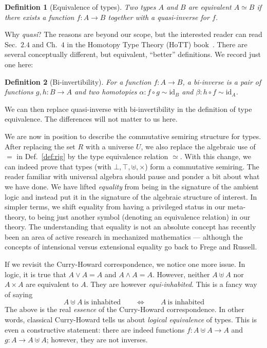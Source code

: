 \documentclass{article}
\newtheorem{defn}{Definition}[section]
\begin{document}
\begin{defn}[Equivalence of types]
  Two types $A$ and $B$ are equivalent $A \simeq B$ if there exists a
  function $f : A \rightarrow B$ together with a quasi-inverse for $f$.
\end{defn}

\noindent Why \emph{quasi}? The reasons are beyond our scope, but the
interested reader can read Sec.~$2.4$ and Ch.~$4$ in the
Homotopy Type Theory (HoTT) book~\cite{hottbook}.
There are several conceptually different, but
equivalent, ``better'' definitions.  We record just one here:

\begin{defn}[Bi-invertibility]
\label{def:biinv}
For a function $f : A \rightarrow B$, a \emph{bi-inverse} is a
pair of functions $g,h : B \rightarrow A$ and two homotopies
$\alpha : f \circ g \sim \mathrm{id}_B$ and
$\beta : h \circ f \sim \mathrm{id}_A$.
\end{defn}

\noindent We can then replace quasi-inverse with bi-invertibility in
the definition of type equivalence. The differences will not matter to
us here.

We are now in position to describe the commutative
semiring structure for types. After replacing the set $R$ with a
universe $U$, we also replace the algebraic use of $=$ in
Def.~\ref{def:rig} by the type equivalence relation $\simeq$. With
this change, we can indeed prove that types (with $\bot, \top, \uplus,
\times$) form a commutative semiring. The reader familiar with
universal algebra should pause and ponder a bit about what we have
done. We have lifted \emph{equality} from being in the signature of
the ambient logic and instead put it in the signature of the algebraic
structure of interest.  In simpler terms, we shift equality from
having a privileged status in our meta-theory, to being just another
symbol (denoting an equivalence relation) in our theory.  The understanding
that equality is not an absolute concept has recently been an area of
active research in mechanized mathematics --- although the concepts of
intensional versus extensional equality go back to Frege and Russell.

If we revisit the Curry-Howard correspondence, we notice one
more issue. In logic, it is true that $A \lor A = A$ and
$A \land A = A$. However, neither $A \uplus A$ nor $A \times A$ are
equivalent to $A$. They are however \emph{equi-inhabited}. This is
a fancy way of saying
\[ A \uplus A \ \text{is inhabited} \qquad \Leftrightarrow \qquad A \
  \text{is inhabited} \] The above is the real \textit{essence} of the
Curry-Howard correspondence.  In other words, classical Curry-Howard
tells us about \emph{logical equivalence} of types. This is even a
constructive statement: there are indeed functions
$f : A \uplus A \rightarrow A$ and $g : A \rightarrow A \uplus A$;
however, they are not inverses.
\end{document}
